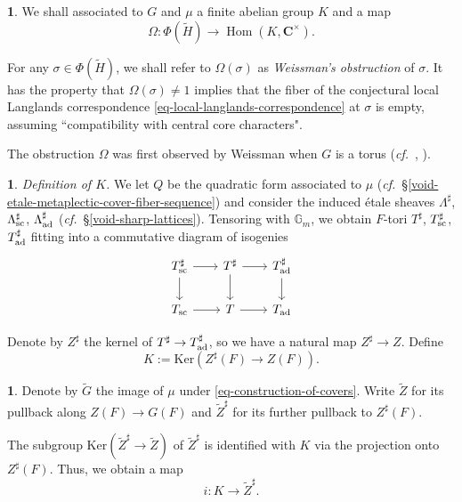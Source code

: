 \documentclass[10pt,english,reqno]{amsart}
\newcommand{\complexes}{\mathbf C}
\newcommand{\Hom}{\operatorname{Hom}}
\newcommand{\Ker}{\mathrm{Ker}}
\newcommand{\sconn}{\textnormal{sc}}
\newcommand{\adjoint}{\textnormal{ad}}
\theoremstyle{definition}
\numberwithin{equation}{section}
\newtheorem{untitledsubsubsection}[subsubsection]{}
\newenvironment{void}
{\begin{untitledsubsubsection}}
{\end{untitledsubsubsection}}
\begin{document}
\begin{void}
We shall associated to $G$ and $\mu$ a finite abelian group $K$ and a map
\begin{equation}
\label{eq-weissman-obstruction}
	\Omega : \Phi(\widetilde H) \rightarrow \Hom(K, \complexes^{\times}).
\end{equation}

For any $\sigma \in \Phi(\widetilde H)$, we shall refer to $\Omega(\sigma)$ as \emph{Weissman's obstruction} of $\sigma$. It has the property that $\Omega(\sigma)\neq 1$ implies that the fiber of the conjectural local Langlands correspondence \eqref{eq-local-langlands-correspondence} at $\sigma$ is empty, assuming ``compatibility with central core characters".

The obstruction $\Omega$ was first observed by Weissman when $G$ is a torus (\emph{cf.}~\cite[\S4]{MR2485462}, \cite[\S8.3]{MR3802419}).
\end{void}


\begin{void}\emph{Definition of $K$.}
\label{void-sharp-center-kernel}
We let $Q$ be the quadratic form associated to $\mu$ (\emph{cf.}~\S\ref{void-etale-metaplectic-cover-fiber-sequence}) and consider the induced \'etale sheaves $\Lambda^{\sharp}$, $\Lambda^{\sharp}_{\sconn}$, $\Lambda^{\sharp}_{\adjoint}$ (\emph{cf.}~\S\ref{void-sharp-lattices}). Tensoring with $\mathbb G_m$, we obtain $F$-tori $T^{\sharp}$, $T^{\sharp}_{\sconn}$, $T^{\sharp}_{\adjoint}$ fitting into a commutative diagram of isogenies
\begin{equation}
\label{eq-sharp-cocharacter-lattice}
\begin{tikzcd}[column sep = 2em]
T_{\sconn}^{\sharp} \ar[r]\ar[d] & T^{\sharp} \ar[r]\ar[d] & T^{\sharp}_{\adjoint} \ar[d] \\
T_{\sconn} \ar[r] &T \ar[r] & T_{\adjoint}
\end{tikzcd}
\end{equation}

Denote by $Z^{\sharp}$ the kernel of $T^{\sharp} \rightarrow T^{\sharp}_{\adjoint}$, so we have a natural map $Z^{\sharp} \rightarrow Z$. Define
$$
K := \Ker(Z^{\sharp}(F) \rightarrow Z(F)).
$$
\end{void}


\begin{void}
Denote by $\widetilde G$ the image of $\mu$ under \eqref{eq-construction-of-covers}. Write $\widetilde Z$ for its pullback along $Z(F) \rightarrow G(F)$ and $\widetilde Z^{\sharp}$ for its further pullback to $Z^{\sharp}(F)$.

The subgroup $\Ker(\widetilde Z^{\sharp} \rightarrow \widetilde Z)$ of $\widetilde Z^{\sharp}$ is identified with $K$ via the projection onto $Z^{\sharp}(F)$. Thus, we obtain a map
\begin{equation}
\label{eq-obstruction-subgroup-sharp-center}
i : K \rightarrow \widetilde Z^{\sharp}.
\end{equation}
\end{void}
\end{document}
